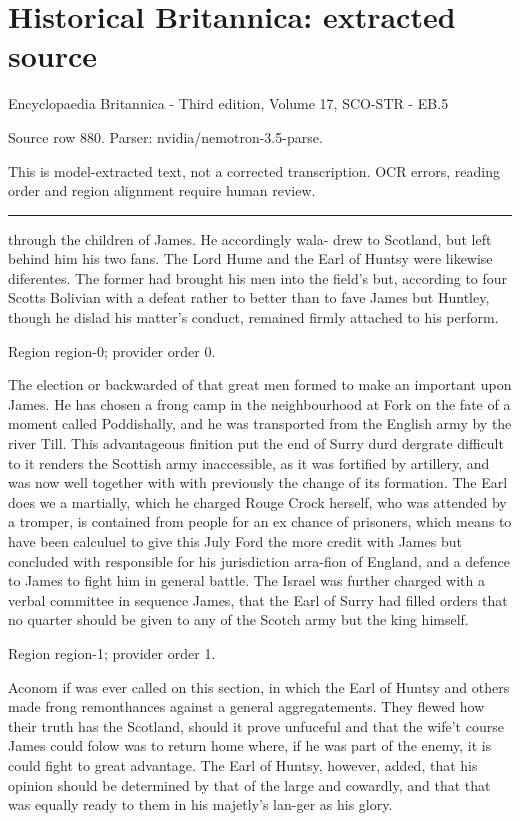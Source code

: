 \documentclass[11pt]{article}
\begin{document}
\section*{Historical Britannica: extracted source}
Encyclopaedia Britannica - Third edition, Volume 17, SCO-STR - EB.5\par
{\small Source row 880. Parser: nvidia/nemotron-3.5-parse.\par}
{\small This is model-extracted text, not a corrected transcription. OCR errors, reading order and region alignment require human review.\par}
\hrule\medskip
through the children of James. He accordingly wala- drew to Scotland, but left behind him his two fans. The Lord Hume and the Earl of Huntsy were likewise diferentes. The former had brought his men into the field's but, according to four Scotts Bolivian with a defeat rather to better than to fave James but Huntley, though he dislad his matter’s conduct, remained firmly attached to his perform.
\par

{\scriptsize\color{gray} Region region-0; provider order 0.\par}
\medskip

The election or backwarded of that great men formed to make an important upon James. He has chosen a frong camp in the neighbourhood at Fork on the fate of a moment called Poddishally, and he was transported from the English army by the river Till. This advantageous finition put the end of Surry durd dergrate difficult to it renders the Scottish army inaccessible, as it was fortified by artillery, and was now well together with with previously the change of its formation. The Earl does we a martially, which he charged Rouge Crock herself, who was attended by a tromper, is contained from people for an ex chance of prisoners, which means to have been calculuel to give this July Ford the more credit with James but concluded with responsible for his jurisdiction arra-fion of England, and a defence to James to fight him in general battle. The Israel was further charged with a verbal committee in sequence James, that the Earl of Surry had filled orders that no quarter should be given to any of the Scotch army but the king himself.
\par

{\scriptsize\color{gray} Region region-1; provider order 1.\par}
\medskip

Aconom if was ever called on this section, in which the Earl of Huntsy and others made frong remonthances against a general aggregatements. They flewed how their truth has the Scotland, should it prove unfuceful and that the wife’t course James could folow was to return home where, if he was part of the enemy, it is could fight to great advantage. The Earl of Huntsy, however, added, that his opinion should be determined by that of the large and cowardly, and that that was equally ready to them in his majetly’s lan-ger as his glory.
\par
\end{document}
